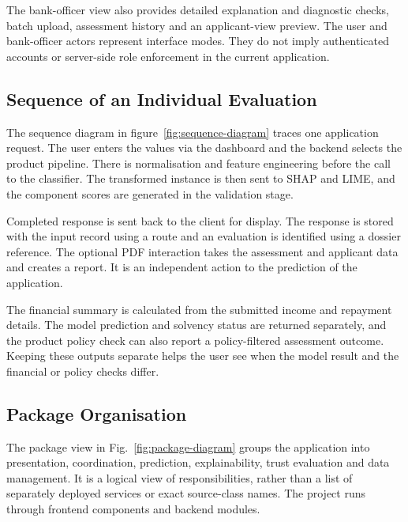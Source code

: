 The bank-officer view also provides detailed explanation and diagnostic checks, batch upload, assessment history and an applicant-view preview. The user and bank-officer actors represent interface modes. They do not imply authenticated accounts or server-side role enforcement in the current application.


\subsection{Sequence of an Individual Evaluation}
The sequence diagram in figure~\ref{fig:sequence-diagram} traces one application request. The user enters the values via the dashboard and the backend selects the product pipeline. There is normalisation and feature engineering before the call to the classifier. The transformed instance is then sent to SHAP and LIME, and the component scores are generated in the validation stage.

Completed response is sent back to the client for display. The response is stored with the input record using a route and an evaluation is identified using a dossier reference. The optional PDF interaction takes the assessment and applicant data and creates a report. It is an independent action to the prediction of the application.

The financial summary is calculated from the submitted income and repayment details. The model prediction and solvency status are returned separately, and the product policy check can also report a policy-filtered assessment outcome. Keeping these outputs separate helps the user see when the model result and the financial or policy checks differ.


\subsection{Package Organisation}
The package view in Fig.~\ref{fig:package-diagram} groups the application into presentation, coordination, prediction, explainability, trust evaluation and data management. It is a logical view of responsibilities, rather than a list of separately deployed services or exact source-class names. The project runs through frontend components and backend modules.

